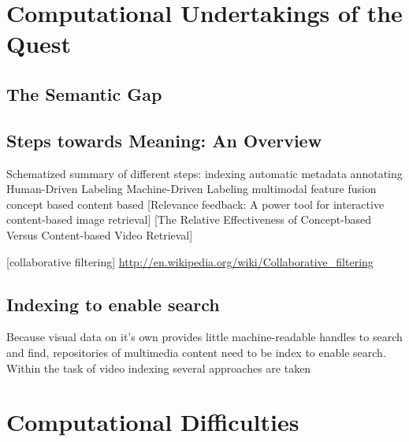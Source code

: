 \section{Computational Undertakings of the Quest}
\subsection{The Semantic Gap}


\subsection{Steps towards Meaning: An Overview}
Schematized summary of different steps:
indexing
automatic metadata
annotating
  Human-Driven Labeling
  Machine-Driven Labeling
multimodal feature fusion
concept based
content based [Relevance feedback: A power tool for interactive content-based image retrieval]\cite{Rui:1998uj}
[The Relative Effectiveness of Concept-based Versus Content-based Video Retrieval]\cite{Yang:2004tc}

[collaborative filtering] \url{http://en.wikipedia.org/wiki/Collaborative_filtering}

\subsection{Indexing to enable search}
Because visual data on it's own provides little machine-readable handles to search and find, repositories of multimedia content need to be index to enable search. Within the task of video indexing several approaches are taken 

\section{Computational Difficulties}







